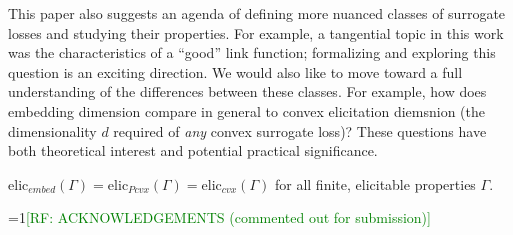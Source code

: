 \documentclass[anon,12pt]{colt2019}
\newcommand{\Comments}{1}
\newcommand{\mynote}[2]{\ifnum\Comments=1\textcolor{#1}{#2}\fi}
\newcommand{\raf}[1]{\mynote{green}{[RF: #1]}}
\begin{document}
This paper also suggests an agenda of defining more nuanced classes of surrogate losses and studying their properties.
For example, a tangential topic in this work was the characteristics of a ``good'' link function; formalizing and exploring this question is an exciting direction.
We would also like to move toward a full understanding of the differences between these classes.
For example, how does embedding dimension compare in general to convex elicitation diemsnion (the dimensionality $d$ required of \emph{any} convex surrogate loss)?
These questions have both theoretical interest and potential practical significance.

\begin{conjecture}
  $\mathrm{elic}_{embed}(\Gamma) = \mathrm{elic}_{Pcvx}(\Gamma) = \mathrm{elic}_{cvx}(\Gamma)$ for all finite, elicitable properties $\Gamma$.
\end{conjecture}


\raf{ACKNOWLEDGEMENTS (commented out for submission)}



\appendix
\end{document}
